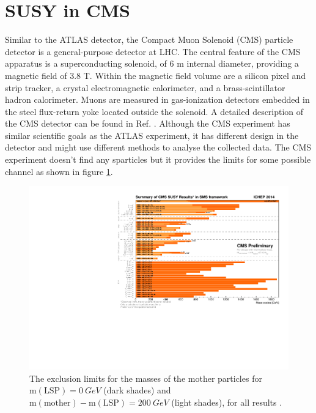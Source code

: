 \documentclass[12pt]{report}
\begin{document}
\section{SUSY in CMS}
Similar to the ATLAS detector, the Compact Muon Solenoid (CMS) particle detector is a general-purpose detector at LHC.
The central feature of the CMS apparatus is a superconducting solenoid, of 6 m internal diameter, providing a magnetic field of 3.8 T.
Within the magnetic field volume are a silicon pixel and strip tracker, a crystal electromagnetic calorimeter, and a brass-scintillator hadron calorimeter.
Muons are measured in gas-ionization detectors embedded in the steel flux-return yoke located outside the solenoid.
A detailed description of the CMS detector can be found in Ref. \cite{cms_detector}.
Although the CMS experiment has similar scientific goals as the ATLAS experiment, it has different design in the detector and might use different methods to analyse the collected data.
The CMS experiment doesn't find any sparticles but it provides the limits for some possible channel as shown in figure \ref{fig: barplot_ICHEP2014}.
\begin{figure}[htbp]
\begin{center}
\includegraphics[scale=0.8]{figures/barplot_ICHEP2014.pdf}
\caption{The exclusion limits for the masses of the mother particles for $\mathrm{m(LSP)} = 0 \ GeV$ (dark shades) and $\mathrm{m(mother)} - \mathrm{m(LSP)} = 200 \ GeV$ (light shades), for all results \cite{cms_results}.} %
\label{fig: barplot_ICHEP2014}
\end{center}
\end{figure}
\end{document}
